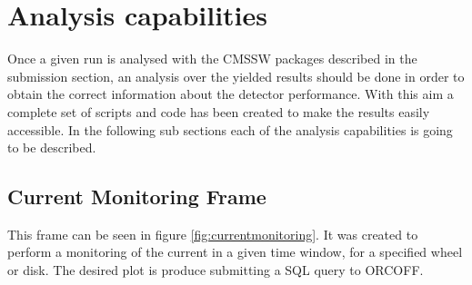 \documentclass[11pt]{amsart}
\begin{document}
\section{Analysis capabilities}
Once a given run is analysed with the CMSSW packages described in the submission section, an analysis over the yielded results should be done in order to obtain the correct information about the detector performance. With this aim a complete set of scripts and code has been created to make the results easily accessible. In the following sub sections each of the analysis capabilities is going to be described. 

\subsection{Current Monitoring Frame}
This frame can be seen in figure \ref{fig:currentmonitoring}. It was created to perform a monitoring of the current in a given time window, for a specified wheel or disk. The desired plot is produce submitting a SQL query to ORCOFF.
\end{document}

